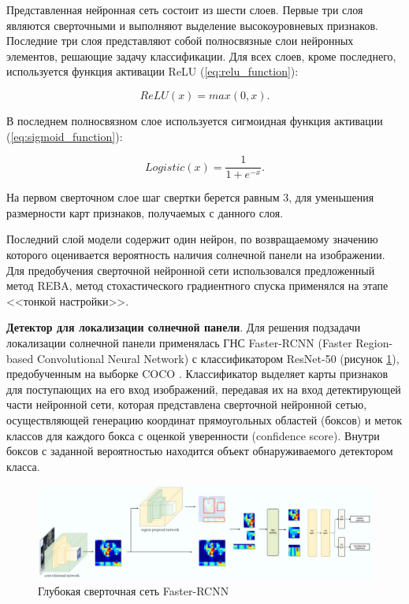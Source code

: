 Представленная нейронная сеть состоит из шести слоев. Первые три слоя являются сверточными и выполняют выделение высокоуровневых признаков. Последние три слоя представляют собой полносвязные слои нейронных элементов, решающие задачу классификации. Для всех слоев, кроме последнего, используется функция активации ReLU (\ref{eq:relu_function}):

\begin{equation}
    \label{eq:relu_function}
    ReLU(x) = max(0, x).
\end{equation}

В последнем полносвязном слое используется сигмоидная функция активации (\ref{eq:sigmoid_function}):

\begin{equation}
    \label{eq:sigmoid_function}
    Logistic(x) = \frac{1}{1+e^{-x}}.
\end{equation}

На первом сверточном слое шаг свертки берется равным 3, для уменьшения размерности карт признаков, получаемых с данного слоя.

Последний слой модели содержит один нейрон, по возвращаемому значению которого оценивается вероятность наличия солнечной панели на изображении. Для предобучения сверточной нейронной сети использовался предложенный метод REBA, метод стохастического градиентного спуска применялся на этапе <<тонкой настройки>>. 

\textbf{Детектор для локализации солнечной панели}. Для решения подзадачи локализации солнечной панели применялась ГНС Faster-RCNN (Faster Region-based Convolutional Neural Network) с классификатором ResNet-50 (рисунок \ref{fig:faster_rcnn}), предобученным на выборке COCO \cite[c.~2]{lin2015}. Классификатор выделяет карты признаков для поступающих на его вход изображений, передавая их на вход детектирующей части нейронной сети, которая представлена сверточной нейронной сетью, осуществляющей генерацию координат прямоугольных областей (боксов) и меток классов для каждого бокса с оценкой уверенности (confidence score). Внутри боксов с заданной вероятностью находится объект обнаруживаемого детектором класса.

\begin{figure}[ht]
	\centering
	\includegraphics[width=17cm]{man-source/images/ch4/pic4-21.jpg}
	\caption{Глубокая сверточная сеть Faster-RCNN \cite{ren}}
	\label{fig:faster_rcnn}
\end{figure}

